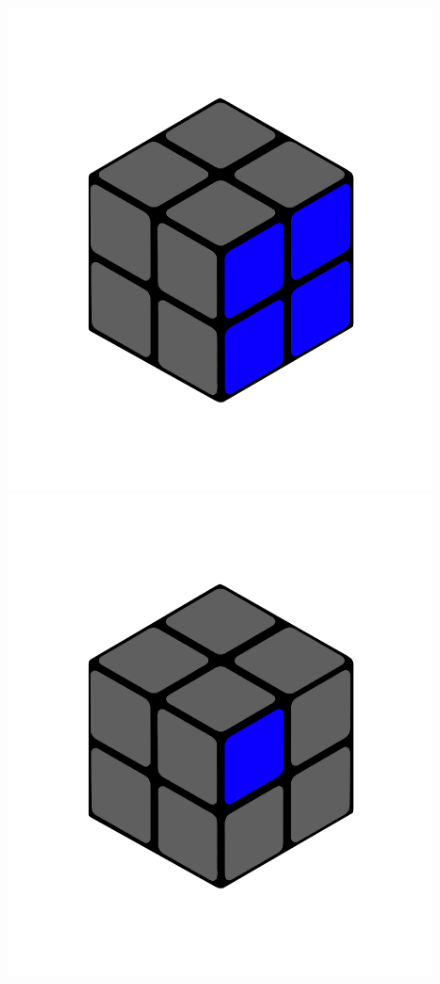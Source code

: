 \documentclass[12pt,a4paper, usenames, dvipsnames]{scrartcl}
\begin{document}
\begin{figure}[h]
\includegraphics[scale=0.085]{2x2seite.png}
\includegraphics[scale=0.085]{2x2farbflaeche.png}

\end{figure}
\end{document}
